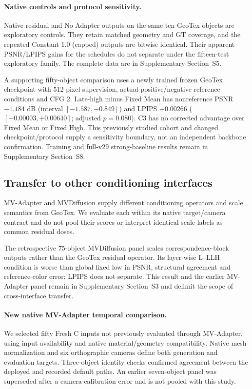 \documentclass[times,twocolumn,final]{elsarticle}
\begin{document}
\paragraph{Native controls and protocol sensitivity.}
Native residual and No Adapter outputs on the same ten GeoTex objects are exploratory controls. They retain matched geometry and GT coverage, and the repeated Constant 1.0 (capped) outputs are bitwise identical. Their apparent PSNR/LPIPS gains for the schedules do not separate under the fifteen-test exploratory family. The complete data are in Supplementary Section~S5.

A supporting fifty-object comparison uses a newly trained frozen GeoTex checkpoint with 512-pixel supervision, actual positive/negative reference conditions and CFG 2. Late-high minus Fixed Mean has nonreference PSNR $-1.184$ dB (interval $[-1.587,-0.849]$) and LPIPS $+0.00266$ ($[-0.00003,+0.00640]$; adjusted $p=0.080$). C3 has no corrected advantage over Fixed Mean or Fixed High. This previously studied cohort and changed checkpoint/protocol supply a sensitivity boundary, not an independent backbone confirmation. Training and full-v29 strong-baseline results remain in Supplementary Section~S8.

\subsection{Transfer to other conditioning interfaces}
\label{subsec:cross-interface}
MV-Adapter and MVDiffusion supply different conditioning operators and scale semantics from GeoTex. We evaluate each within its native target/camera contract and do not pool their scores or interpret identical scale labels as common residual doses.

The retrospective 75-object MVDiffusion panel scales correspondence-block outputs rather than the GeoTex residual operator. Its layer-wise L--LLH condition is worse than global fixed low in PSNR, structural agreement and reference-color error; LPIPS does not separate. This result and the earlier MV-Adapter panel remain in Supplementary Section~S3 and delimit the scope of cross-interface transfer.

\paragraph{New native MV-Adapter temporal comparison.}
\label{subsec:new-mva}
We selected fifty Fresh C inputs not previously evaluated through MV-Adapter, using input availability and native material/geometry compatibility. Native mesh normalization and six orthographic cameras define both generation and evaluation targets. Three-object identity checks confirmed agreement between the deployed and recorded default paths. An earlier seven-object panel was superseded after a camera-calibration error and is not pooled with this study.
\end{document}

